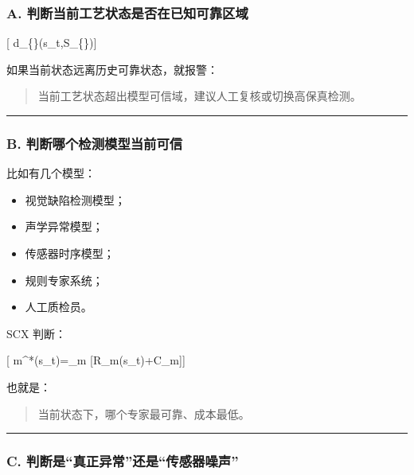 \documentclass[
  12pt,
]{ctexart}
\providecommand{\tightlist}{%
  \setlength{\itemsep}{0pt}\setlength{\parskip}{0pt}}
\begin{document}
\subsubsection{A.
判断当前工艺状态是否在已知可靠区域}\label{a.-ux5224ux65adux5f53ux524dux5de5ux827aux72b6ux6001ux662fux5426ux5728ux5df2ux77e5ux53efux9760ux533aux57df}

{[} d\_\{\}(s\_t,\mathcal S\_\{\}){]}

如果当前状态远离历史可靠状态，就报警：

\begin{quote}
当前工艺状态超出模型可信域，建议人工复核或切换高保真检测。
\end{quote}

\begin{center}\rule{0.5\linewidth}{0.5pt}\end{center}

\subsubsection{B.
判断哪个检测模型当前可信}\label{b.-ux5224ux65adux54eaux4e2aux68c0ux6d4bux6a21ux578bux5f53ux524dux53efux4fe1}

比如有几个模型：

\begin{itemize}
\tightlist
\item
  视觉缺陷检测模型；
\item
  声学异常模型；
\item
  传感器时序模型；
\item
  规则专家系统；
\item
  人工质检员。
\end{itemize}

SCX 判断：

{[} m\^{}*(s\_t)=\arg\min\_m {[}\widehat R\_m(s\_t)+\lambda C\_m{]}{]}

也就是：

\begin{quote}
当前状态下，哪个专家最可靠、成本最低。
\end{quote}

\begin{center}\rule{0.5\linewidth}{0.5pt}\end{center}

\subsubsection{C.
判断是``真正异常''还是``传感器噪声''}\label{c.-ux5224ux65adux662fux771fux6b63ux5f02ux5e38ux8fd8ux662fux4f20ux611fux5668ux566aux58f0}
\end{document}
